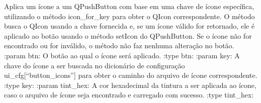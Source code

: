 \documentclass[letterpaper,10pt,english]{sphinxmanual}
\begin{document}
\begin{fulllineitems}
\begin{fulllineitems}
\begin{quote}
\begin{description}
\end{description}\end{quote}

\end{fulllineitems}


\begin{fulllineitems}
\label{\detokenize{api/icon_manager:icon_manager.IconManager.apply_button_icon}}
\pysigstartsignatures
\pysiglinewithargsret
{}
{\sphinxparamcomma {}\sphinxparamcomma {}}
{}
\pysigstopsignatures
\sphinxAtStartPar
Aplica um ícone a um QPushButton com base em uma chave de ícone específica, utilizando o método icon\_for\_key para obter o QIcon correspondente. O método busca o QIcon usando a chave fornecida e, se um ícone válido for retornado, ele é aplicado ao botão usando o método setIcon do QPushButton. Se o ícone não for encontrado ou for inválido, o método não faz nenhuma alteração no botão.
:param btn: O botão ao qual o ícone será aplicado.
:type btn: 
:param key: A chave do ícone a ser buscada no dicionário de configuração ui\_cfg{[}“button\_icons”{]} para obter o caminho do arquivo de ícone correspondente.
:type key: 
:param tint\_hex: A cor hexadecimal da tintura a ser aplicada ao ícone, caso o arquivo de ícone seja encontrado e carregado com sucesso.
:type tint\_hex: 
\begin{quote}\begin{description}
\sphinxAtStartPar
{}

\end{description}\end{quote}

\end{fulllineitems}



\end{fulllineitems}
\end{document}
